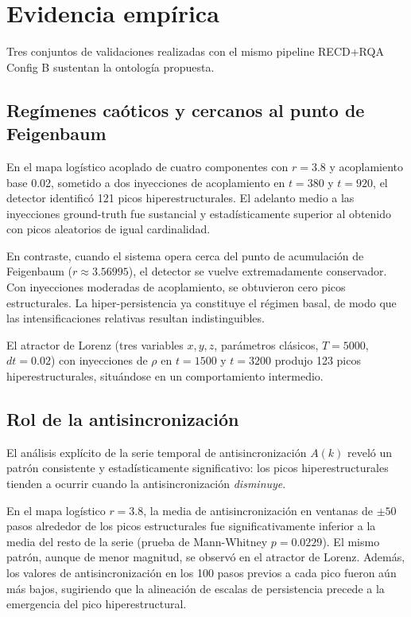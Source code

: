 \section{Evidencia empírica}

Tres conjuntos de validaciones realizadas con el mismo pipeline RECD+RQA Config B sustentan la ontología propuesta.

\subsection{Regímenes caóticos y cercanos al punto de Feigenbaum}

En el mapa logístico acoplado de cuatro componentes con $r=3.8$ y acoplamiento base 0.02, sometido a dos inyecciones de acoplamiento en $t=380$ y $t=920$, el detector identificó 121 picos hiperestructurales. El adelanto medio a las inyecciones ground-truth fue sustancial y estadísticamente superior al obtenido con picos aleatorios de igual cardinalidad.

En contraste, cuando el sistema opera cerca del punto de acumulación de Feigenbaum ($r \approx 3.56995$), el detector se vuelve extremadamente conservador. Con inyecciones moderadas de acoplamiento, se obtuvieron cero picos estructurales. La hiper-persistencia ya constituye el régimen basal, de modo que las intensificaciones relativas resultan indistinguibles.

El atractor de Lorenz (tres variables $x,y,z$, parámetros clásicos, $T=5000$, $dt=0.02$) con inyecciones de $\rho$ en $t=1500$ y $t=3200$ produjo 123 picos hiperestructurales, situándose en un comportamiento intermedio.

\subsection{Rol de la antisincronización}

El análisis explícito de la serie temporal de antisincronización $A(k)$ reveló un patrón consistente y estadísticamente significativo: los picos hiperestructurales tienden a ocurrir cuando la antisincronización \textit{disminuye}.

En el mapa logístico $r=3.8$, la media de antisincronización en ventanas de $\pm 50$ pasos alrededor de los picos estructurales fue significativamente inferior a la media del resto de la serie (prueba de Mann-Whitney $p=0.0229$). El mismo patrón, aunque de menor magnitud, se observó en el atractor de Lorenz. Además, los valores de antisincronización en los 100 pasos previos a cada pico fueron aún más bajos, sugiriendo que la alineación de escalas de persistencia precede a la emergencia del pico hiperestructural.

